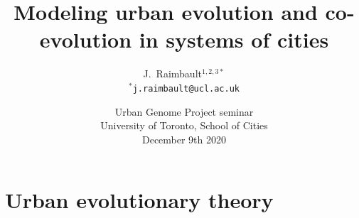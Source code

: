 



\title[Urban evolution and co-evolution]{Modeling urban evolution and co-evolution in systems of cities}
\author[Raimbault]{J.~Raimbault$^{1,2,3\ast}$\\\medskip
$^{\ast}$\texttt{j.raimbault@ucl.ac.uk}
}



\date[July 18th 2020]{Urban Genome Project seminar\\
University of Toronto, School of Cities\\
December 9th 2020
}

\frame{\maketitle}



%
%







\section{Urban evolutionary theory}




